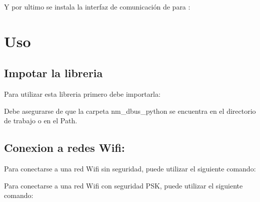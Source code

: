 \documentclass[letterpaper,10pt,english]{sphinxhowto}
\begin{document}
Y por ultimo se instala la interfaz de comunicación de  para :

\begin{sphinxVerbatim}[commandchars=\\\{\}]
   
\end{sphinxVerbatim}


\chapter{Uso}
\label{\detokenize{index:uso}}

\section{Impotar la libreria}
\label{\detokenize{index:impotar-la-libreria}}
Para utilizar esta libreria primero debe importarla:

\begin{sphinxVerbatim}[commandchars=\\\{\}]
 
\end{sphinxVerbatim}

Debe asegurarse de que la carpeta nm\_dbus\_python se encuentra en el directorio de trabajo o en el Path.


\section{Conexion a redes Wifi:}
\label{\detokenize{index:conexion-a-redes-wifi}}
Para conectarse a una red Wifi sin seguridad, puede utilizar el siguiente comando:

\begin{sphinxVerbatim}[commandchars=\\\{\}]
\end{sphinxVerbatim}

Para conectarse a una red Wifi con seguridad PSK, puede utilizar el siguiente comando:

\begin{sphinxVerbatim}[commandchars=\\\{\}]
 
\end{sphinxVerbatim}
\end{document}
